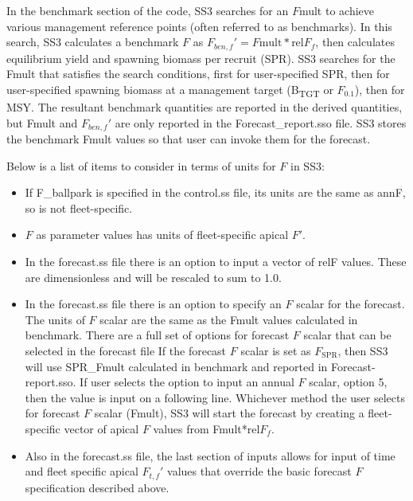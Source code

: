 In the benchmark section of the code, SS3 searches for an $F$mult to achieve various management reference points (often referred to as benchmarks). In this search, SS3 calculates a benchmark $F$ as  $F_{ben,f}' = F\text{mult} * \text{rel}F_f$, then calculates equilibrium yield and spawning biomass per recruit (SPR). SS3 searches for the Fmult that satisfies the search conditions, first for user-specified SPR, then for user-specified spawning biomass at a management target (B\textsubscript{TGT} or $F_{0.1}$), then for MSY. The resultant benchmark quantities are reported in the derived quantities, but Fmult and $F_{ben,f}'$ are only reported in the Forecast\_report.sso file. SS3 stores the benchmark Fmult values so that user can invoke them for the forecast.

Below is a list of items to consider in terms of units for $F$ in SS3:
\begin{itemize}
	\item If F\_ballpark is specified in the control.ss file, its units are the same as annF, so is not fleet-specific.
	
	\item $F$ as parameter values has units of fleet-specific apical $F'$.
	
	\item In the forecast.ss file there is an option to input a vector of relF values. These are dimensionless and will be rescaled to sum to 1.0.
	
	\item In the forecast.ss file there is an option to specify an $F$ scalar for the forecast.  The units of $F$ scalar are the same as the Fmult values calculated in benchmark.  There are a full set of options for forecast $F$ scalar that can be selected in the forecast file 
	If the forecast $F$ scalar is set as $F_\text{SPR}$, then SS3 will use SPR\_Fmult calculated in benchmark and reported in Forecast-report.sso.  If user selects the option to input an annual $F$ scalar, option 5, then the value is input on a following line.  Whichever method the user selects for forecast $F$ scalar (Fmult), SS3 will start the forecast by creating a fleet-specific vector of apical $F$ values from Fmult*rel$F_f$.
	
	\item Also in the forecast.ss file, the last section of inputs allows for input of time and fleet specific apical $F_{t,f}'$ values that override the basic forecast $F$ specification described above.
\end{itemize}